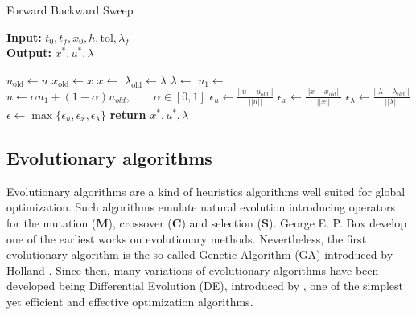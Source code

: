 \begin{algorithm}
  \caption{Forward Backward Sweep } \label{alg:forward_backward_sweep}
  \begin{flushleft}
    \hspace*{\algorithmicindent} \textbf{Input:} 
    $t_0, t_f, x_0,h, \text{tol}, \lambda_{f}$ \\
    \hspace*{\algorithmicindent} \textbf{Output:} 
    $x^*, u^*, \lambda$
  \end{flushleft}
  \begin{algorithmic}
      \State $u_{\text{old}} \gets u$ 
      \State $x_{\text{old}} \gets x$ 
      \State $ x \gets$
      \State $\lambda_{\text{old}} \gets \lambda $
      \State $\lambda \gets$ 
      \State $u_1 \gets$ 
      \State 
        $u \gets \alpha u_1 + (1-\alpha)u_{old}, 
        \qquad \alpha \in [0, 1]$
      \State 
      $\epsilon_u \gets \displaystyle 
        \frac{||u - u_{\text{old}}||}{||u||}$
      \State 
      $\epsilon_x \gets \displaystyle 
        \frac{||x - x_{\text{old}}||}{||x||}$
      \State 
        $\epsilon_{\lambda} \gets \displaystyle 
        \frac{||\lambda - \lambda_{\text{old}}||}{||\lambda||}$
      \State 
        $\epsilon \gets 
        \max{ 
          \{ \epsilon_u, \epsilon_x, \epsilon_{\lambda} \}
       }$
    \EndWhile\label{}
      \State \textbf{return} $ x^*, u^*, \lambda$
    \EndProcedure
  \end{algorithmic}
\end{algorithm}
\medskip  
\subsection{Evolutionary algorithms}
Evolutionary algorithms are a kind of heuristics algorithms well suited for 
global optimization. Such algorithms emulate natural evolution introducing 
operators for the mutation ($\mathbf{M}$), crossover ($\mathbf{C}$) and 
selection ($\mathbf{S}$). George E. P. Box \cite{Box1957}
develop one of the earliest works on evolutionary methods. Nevertheless,  the 
first evolutionary algorithm is the so-called Genetic Algorithm (GA) introduced 
by Holland \citet{JHH1975}. Since then, many variations of
evolutionary algorithms have been developed being Differential Evolution (DE),
introduced by \citet{Storn1997}, one of the simplest yet 
efficient and effective optimization algorithms. 

